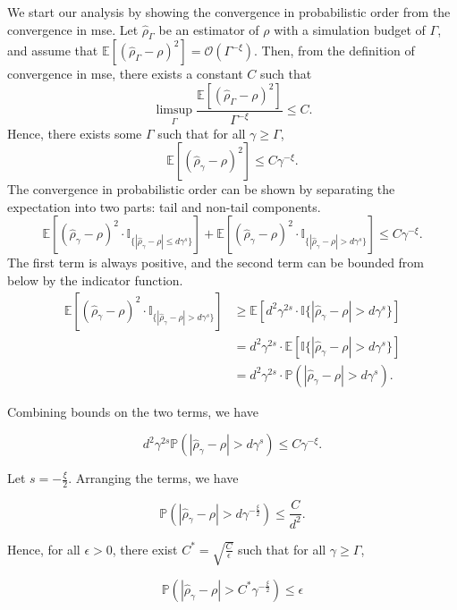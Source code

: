We start our analysis by showing the convergence in probabilistic order from the convergence in \gls{mse}.
Let $\hat{\rho}_{\Gamma}$ be an estimator of $\rho$ with a simulation budget of $\Gamma$, and assume that $\mathbb{E} \left[ \left(\hat{\rho}_{\Gamma} - \rho\right)^2 \right] = \mathcal{O} \left( \Gamma^{-\xi} \right)$.
Then, from the definition of convergence in \gls{mse}, there exists a constant $C$ such that 
$$
    \limsup_{\Gamma} \frac{\mathbb{E} \left[ \left(\hat{\rho}_{\Gamma} - \rho\right)^2 \right]}{\Gamma^{-\xi}} \leq C.
$$
Hence, there exists some $\Gamma$ such that for all $\gamma \geq \Gamma$,
$$
\mathbb{E} \left[ \left(\hat{\rho}_{\gamma} - \rho\right)^2 \right] \leq C\gamma^{-\xi}.
$$
The convergence in probabilistic order can be shown by separating the expectation into two parts: tail and non-tail components.
$$
\mathbb{E} \left[ \left(\hat{\rho}_{\gamma} - \rho\right)^2 \cdot \mathbb{I}_{\{|\hat{\rho}_{\gamma} - \rho| \leq d\gamma^s\}} \right] + \mathbb{E} \left[ \left(\hat{\rho}_{\gamma} - \rho\right)^2 \cdot \mathbb{I}_{\{|\hat{\rho}_{\gamma} - \rho| > d\gamma^s\}} \right] \leq C\gamma^{-\xi}.
$$
The first term is always positive, and the second term can be bounded from below by the indicator function.
\begin{align*}
\mathbb{E} \left[ \left(\hat{\rho}_{\gamma} - \rho\right)^2 \cdot \mathbb{I}_{\{|\hat{\rho}_{\gamma} - \rho| > d\gamma^s\}} \right] 
& \geq \mathbb{E} \left[ d^2 \gamma^{2s} \cdot \mathbb{I}\{|\hat{\rho}_{\gamma} - \rho| > d\gamma^s\} \right] \\
& = d^2 \gamma^{2s} \cdot \mathbb{E} \left[ \mathbb{I}\{|\hat{\rho}_{\gamma} - \rho| > d\gamma^s \} \right] \\
& = d^2 \gamma^{2s} \cdot \mathbb{P} \left(|\hat{\rho}_{\gamma} - \rho| > d\gamma^s \right).
\end{align*}

Combining bounds on the two terms, we have

$$
    d^2 \gamma^{2s} \mathbb{P} \left(|\hat{\rho}_{\gamma} - \rho| > d\gamma^s \right) \leq C \gamma^{-\xi}.
$$

Let $s = -\frac{\xi}{2}$. Arranging the terms, we have

$$
    \mathbb{P} \left( |\hat{\rho}_{\gamma} - \rho| > d\gamma^{-\frac{\xi}{2}} \right) \leq \frac{C}{d^2}.
$$

Hence, for all $\epsilon >0$, there exist $C^* = \sqrt{\frac{C}{\epsilon}}$ such that for all $\gamma \geq \Gamma$,

$$
    \mathbb{P} \left( |\hat{\rho}_{\gamma} - \rho| > C^*\gamma^{-\frac{\xi}{2}} \right) \leq \epsilon
$$

